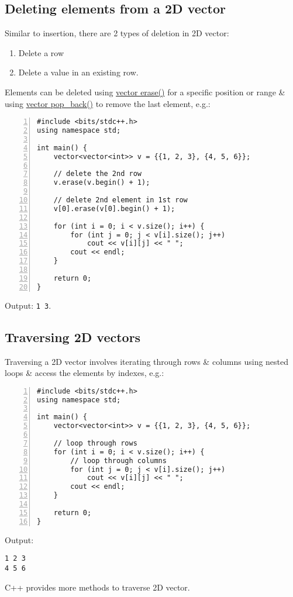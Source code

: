 \documentclass{article}
\begin{document}
\subsection{Deleting elements from a 2D vector}
Similar to insertion, there are 2 types of deletion in 2D vector:
\begin{enumerate}
	\item Delete a row
	\item Delete a value in an existing row.
\end{enumerate}
Elements can be deleted using \href{https://www.geeksforgeeks.org/vector-erase-and-clear-in-cpp/}{vector erase()} for a specific position or range \& using \href{https://www.geeksforgeeks.org/vectorpush_back-vectorpop_back-c-stl/}{vector pop\_back()} to remove the last element, e.g.:
\begin{Verbatim}[numbers=left,xleftmargin=5mm]
#include <bits/stdc++.h>
using namespace std;

int main() {
    vector<vector<int>> v = {{1, 2, 3}, {4, 5, 6}};
	
    // delete the 2nd row
    v.erase(v.begin() + 1);
	
    // delete 2nd element in 1st row
    v[0].erase(v[0].begin() + 1);
	
    for (int i = 0; i < v.size(); i++) {
        for (int j = 0; j < v[i].size(); j++)
            cout << v[i][j] << " ";
        cout << endl;
    }
	
    return 0;
}
\end{Verbatim}
Output: {\tt1 3}.


\subsection{Traversing 2D vectors}
Traversing a 2D vector involves iterating through rows \& columns using nested loops \& access the elements by indexes, e.g.:
\begin{Verbatim}[numbers=left,xleftmargin=5mm]
#include <bits/stdc++.h>
using namespace std;

int main() {
    vector<vector<int>> v = {{1, 2, 3}, {4, 5, 6}};
	
    // loop through rows
    for (int i = 0; i < v.size(); i++) {
        // loop through columns
        for (int j = 0; j < v[i].size(); j++)
            cout << v[i][j] << " ";
        cout << endl;
    }
	
    return 0;
}
\end{Verbatim}
Output:
\begin{verbatim}
1 2 3
4 5 6
\end{verbatim}
C++ provides more methods to traverse 2D vector.
\end{document}
